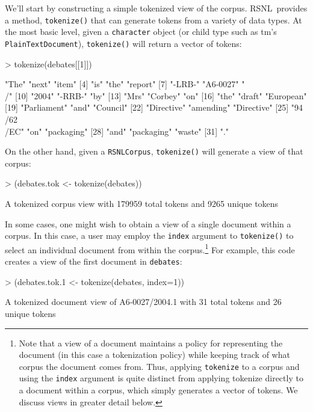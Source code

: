\documentclass[11pt]{article}
\def\RSNL{{\normalfont\fontseries{b}\selectfont RSNL}}
\def\tm{{\normalfont\fontseries{b}\selectfont tm}}
\let\code=\texttt
\let\rclass=\texttt
\begin{document}
We'll start by constructing a simple tokenized view of the corpus.
\RSNL\ provides a method, \code{tokenize()} that can generate tokens
from a variety of data types.  At the most basic level, given a
\code{character} object (or child type such as \tm's
\rclass{PlainTextDocument}), \code{tokenize()} will return a vector of
tokens:
\begin{Schunk}
\begin{Sinput}
> tokenize(debates[[1]])
\end{Sinput}
\begin{Soutput}
 [1] "The"          "next"         "item"        
 [4] "is"           "the"          "report"      
 [7] "-LRB-"        "A6-0027"      "\\/"         
[10] "2004"         "-RRB-"        "by"          
[13] "Mrs"          "Corbey"       "on"          
[16] "the"          "draft"        "European"    
[19] "Parliament"   "and"          "Council"     
[22] "Directive"    "amending"     "Directive"   
[25] "94\\/62\\/EC" "on"           "packaging"   
[28] "and"          "packaging"    "waste"       
[31] "."           
\end{Soutput}
\end{Schunk}
On the other hand, given a \rclass{RSNLCorpus}, \code{tokenize()} will
generate a view of that corpus:
\begin{Schunk}
\begin{Sinput}
> (debates.tok <- tokenize(debates))
\end{Sinput}
\begin{Soutput}
A tokenized corpus view with 179959 total tokens and 9265 unique tokens
\end{Soutput}
\end{Schunk}
In some cases, one might wish to obtain a view of a single document
within a corpus.  In this case, a user may employ the \code{index}
argument to \code{tokenize()} to select an individual document from
within the corpus.\footnote{Note that a view of a document maintains a
policy for representing the document (in this case a tokenization
policy) while keeping track of what corpus the document comes from.
Thus, applying \code{tokenize} to a corpus and using the \code{index}
argument is quite distinct from applying tokenize directly to a
document within a corpus, which simply generates a vector of tokens.
We discuss views in greater detail below.} For example, this code
creates a view of the first document in \code{debates}:
\begin{Schunk}
\begin{Sinput}
> (debates.tok.1 <- tokenize(debates, index=1))
\end{Sinput}
\begin{Soutput}
A tokenized document view of A6-0027/2004.1 with 31 total tokens and 26 unique tokens
\end{Soutput}
\end{Schunk}
\end{document}

